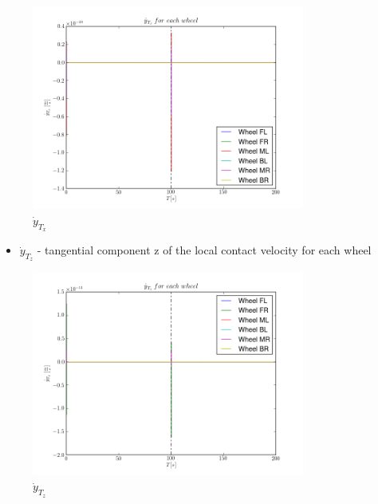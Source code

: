\begin{figure}[H]
  \centering
    \includegraphics[width=0.8\textwidth]{yTxdots4}
  \caption{$\dot{y}_{T_x}$}
\end{figure}

\begin{itemize}
  \item $\dot{y}_{T_z}$ - tangential component z of the local contact velocity for each wheel
\end{itemize}

\begin{figure}[H]
  \centering
    \includegraphics[width=0.8\textwidth]{yTzdots4}
  \caption{$\dot{y}_{T_z}$}
\end{figure}

